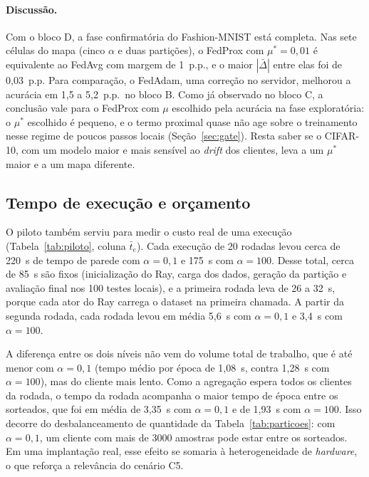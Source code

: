 \paragraph{Discussão.} Com o bloco D, a fase confirmatória do Fashion-MNIST está completa. Nas sete células do mapa (cinco $\alpha$ e duas partições), o FedProx com $\mu^* = 0{,}01$ é equivalente ao FedAvg com margem de 1~p.p., e o maior $|\bar\Delta|$ entre elas foi de 0,03~p.p. Para comparação, o FedAdam, uma correção no servidor, melhorou a acurácia em 1,5 a 5,2~p.p.\ no bloco B. Como já observado no bloco C, a conclusão vale para o FedProx com $\mu$ escolhido pela acurácia na fase exploratória: o $\mu^*$ escolhido é pequeno, e o termo proximal quase não age sobre o treinamento nesse regime de poucos passos locais (Seção~\ref{sec:gate}). Resta saber se o CIFAR-10, com um modelo maior e mais sensível ao \textit{drift} dos clientes, leva a um $\mu^*$ maior e a um mapa diferente.

\subsection{Tempo de execução e orçamento}

O piloto também serviu para medir o custo real de uma execução (Tabela~\ref{tab:piloto}, coluna $\bar t_e$). Cada execução de 20 rodadas levou cerca de 220~s de tempo de parede com $\alpha = 0{,}1$ e 175~s com $\alpha = 100$. Desse total, cerca de 85~s são fixos (inicialização do Ray, carga dos dados, geração da partição e avaliação final nos 100 testes locais), e a primeira rodada leva de 26 a 32~s, porque cada ator do Ray carrega o dataset na primeira chamada. A partir da segunda rodada, cada rodada levou em média 5,6~s com $\alpha = 0{,}1$ e 3,4~s com $\alpha = 100$.

A diferença entre os dois níveis não vem do volume total de trabalho, que é até menor com $\alpha = 0{,}1$ (tempo médio por época de 1,08~s, contra 1,28~s com $\alpha = 100$), mas do cliente mais lento. Como a agregação espera todos os clientes da rodada, o tempo da rodada acompanha o maior tempo de época entre os sorteados, que foi em média de 3,35~s com $\alpha = 0{,}1$ e de 1,93~s com $\alpha = 100$. Isso decorre do desbalanceamento de quantidade da Tabela~\ref{tab:particoes}: com $\alpha = 0{,}1$, um cliente com mais de \num{3000} amostras pode estar entre os sorteados. Em uma implantação real, esse efeito se somaria à heterogeneidade de \textit{hardware}, o que reforça a relevância do cenário C5.

